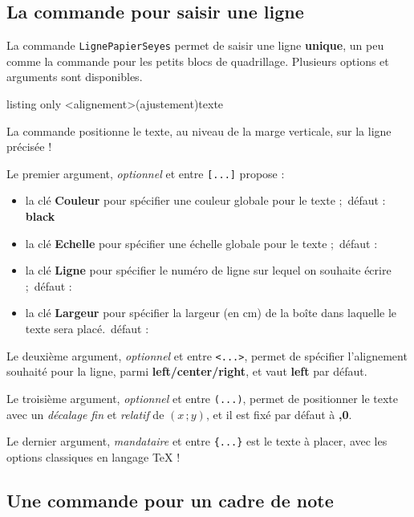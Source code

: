 \documentclass[a4paper]{article}
\newcommand\Cle[1]{{\bfseries\sffamily\textlangle #1\textrangle}}
\begin{document}
\subsection{La commande pour saisir une ligne}

La commande \texttt{LignePapierSeyes} permet de saisir une ligne \textbf{unique}, un peu comme la commande pour les petits blocs de quadrillage. Plusieurs options et arguments sont disponibles.

\begin{PresentationCode}{listing only}
\LignePapierSeyes[options]<alignement>(ajustement){texte}
\end{PresentationCode}

La commande positionne le \textsf{texte}, au niveau de la marge verticale, sur la ligne précisée !

\smallskip

Le premier argument, \textit{optionnel} et entre \texttt{[...]} propose :

\begin{itemize}
	\item la clé \Cle{Couleur} pour spécifier une couleur globale pour le texte ;\hfill~défaut : \Cle{black}
	\item la clé \Cle{Echelle} pour spécifier une échelle globale pour le texte ;\hfill~défaut : \Cle{1}
	\item la clé \Cle{Ligne} pour spécifier le numéro de ligne sur lequel on souhaite écrire ;\hfill~défaut : \Cle{1}
	\item la clé \Cle{Largeur} pour spécifier la largeur (en cm) de la boîte dans laquelle le texte sera placé.\hfill~défaut : \Cle{16.8}
\end{itemize}

Le deuxième argument, \textit{optionnel} et entre \texttt{<...>}, permet de spécifier l'alignement souhaité pour la ligne, parmi \Cle{left/center/right}, et vaut \Cle{left} par défaut.

\smallskip

Le troisième argument, \textit{optionnel} et entre \texttt{(...)}, permet de positionner le texte avec un \textit{décalage fin} et \textit{relatif} de $(x\,;y)$, et il est fixé par défaut à \Cle{0,0}.

\smallskip

Le dernier argument, \textit{mandataire} et entre \texttt{\{...\}} est le texte à placer, avec les options classiques en langage \TeX{} !

\subsection{Une commande pour un cadre de note}
\end{document}
